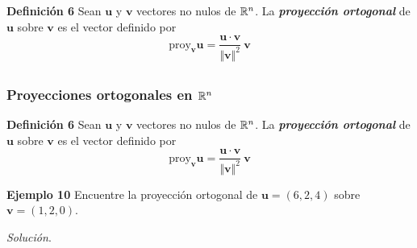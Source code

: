{\begin{frame}
\begin{defi}{\textbf{Definición 6}}\justifying
	\justifying
	Sean $\mathbf{u}$ y $\mathbf{v}$ vectores no nulos de $\mathbb{R}^n$. La \textbf{\textit{proyección ortogonal}} de $\mathbf{u}$ sobre $\mathbf{v}$
	es el vector definido por
	\[
		\text{proy}_{\mathbf{v}} \mathbf{u} = \frac{\mathbf{u}\cdot \mathbf{v}}{\Vert \mathbf{v}\Vert^2}\ \mathbf{v}
	\]
\end{defi}	

\end{frame}
}


\subsection{}

\begin{frame}\frametitle{Proyecciones ortogonales en $\mathbb{R}^n$}

\begin{defi}{\textbf{Definición 6}}\justifying
	\justifying
	Sean $\mathbf{u}$ y $\mathbf{v}$ vectores no nulos de $\mathbb{R}^n$. La \textbf{\textit{proyección ortogonal}} de $\mathbf{u}$ sobre $\mathbf{v}$
	es el vector definido por
	\[
	\text{proy}_{\mathbf{v}} \mathbf{u} = \frac{\mathbf{u}\cdot \mathbf{v}}{\Vert \mathbf{v}\Vert^2}\ \mathbf{v}
	\]
\end{defi}	

\begin{ej}{\textbf{Ejemplo 10}}
	Encuentre la proyección ortogonal de $\mathbf{u}=(6,2,4)$ sobre $\mathbf{v}=(1,2,0)$.
\end{ej}
\textit{Solución}.

\end{frame}
